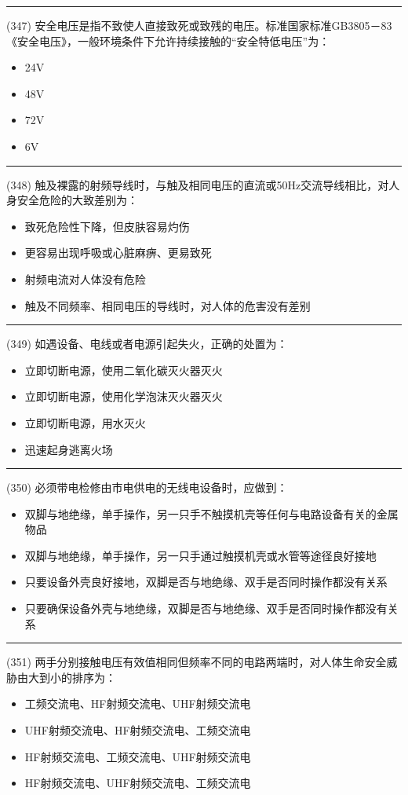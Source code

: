 \documentclass[twocolumn]{ctexart}  %
\begin{document}
\noindent\rule{0.5\textwidth}{1pt}
\heiti (347) 安全电压是指不致使人直接致死或致残的电压。标准国家标准GB3805－83《安全电压》，一般环境条件下允许持续接触的“安全特低电压”为： \songti {\color{gray} [LK1000] }
\begin{itemize}
	\item  24V
	\item  48V
	\item  72V
	\item  6V
\end{itemize}


\noindent\rule{0.5\textwidth}{1pt}
\heiti (348) 触及裸露的射频导线时，与触及相同电压的直流或50Hz交流导线相比，对人身安全危险的大致差别为： \songti {\color{gray} [LK1001] }
\begin{itemize}
	\item  致死危险性下降，但皮肤容易灼伤
	\item  更容易出现呼吸或心脏麻痹、更易致死
	\item  射频电流对人体没有危险
	\item  触及不同频率、相同电压的导线时，对人体的危害没有差别
\end{itemize}


\noindent\rule{0.5\textwidth}{1pt}
\heiti (349) 如遇设备、电线或者电源引起失火，正确的处置为： \songti {\color{gray} [LK1039] }
\begin{itemize}
	\item  立即切断电源，使用二氧化碳灭火器灭火
	\item  立即切断电源，使用化学泡沫灭火器灭火
	\item  立即切断电源，用水灭火
	\item  迅速起身逃离火场
\end{itemize}


\noindent\rule{0.5\textwidth}{1pt}
\heiti (350) 必须带电检修由市电供电的无线电设备时，应做到： \songti {\color{gray} [LK1040] }
\begin{itemize}
	\item  双脚与地绝缘，单手操作，另一只手不触摸机壳等任何与电路设备有关的金属物品
	\item  双脚与地绝缘，单手操作，另一只手通过触摸机壳或水管等途径良好接地
	\item  只要设备外壳良好接地，双脚是否与地绝缘、双手是否同时操作都没有关系
	\item  只要确保设备外壳与地绝缘，双脚是否与地绝缘、双手是否同时操作都没有关系
\end{itemize}


\noindent\rule{0.5\textwidth}{1pt}
\heiti (351) 两手分别接触电压有效值相同但频率不同的电路两端时，对人体生命安全威胁由大到小的排序为： \songti {\color{gray} [LK1043] }
\begin{itemize}
	\item  工频交流电、HF射频交流电、UHF射频交流电
	\item  UHF射频交流电、HF射频交流电、工频交流电
	\item  HF射频交流电、工频交流电、UHF射频交流电
	\item  HF射频交流电、UHF射频交流电、工频交流电
\end{itemize}
\end{document}
